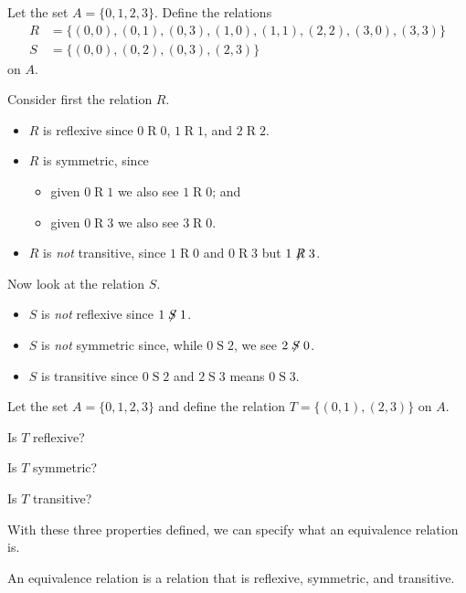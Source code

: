 \begin{example}
    Let the set $A = \{0,1,2,3\}$. Define the relations
    \begin{align*}
        R &= \{(0,0),(0,1),(0,3),(1,0),(1,1),(2,2),(3,0),(3,3)\}\\
        S &= \{(0,0),(0,2),(0,3),(2,3)\}
    \end{align*}
    on $A$.

    Consider first the relation $R$.
    \begin{itemize}
        \item $R$ is reflexive since $0\mathrel{R}0$, $1\mathrel{R}1$, and $2\mathrel{R}2$.
        \item $R$ is symmetric, since
        \begin{itemize}
            \item given $0\mathrel{R}1$ we also see $1\mathrel{R}0$; and
            \item given $0\mathrel{R}3$ we also see $3\mathrel{R}0$.
        \end{itemize}
        \item $R$ is \textit{not} transitive, since $1\mathrel{R}0$ and $0\mathrel{R}3$ but $1\not\mathrel{R}3$.
    \end{itemize}

    Now look at the relation $S$.
    \begin{itemize}
        \item $S$ is \textit{not} reflexive since $1\not\mathrel{S}1$.
        \item $S$ is \textit{not} symmetric since, while $0\mathrel{S}2$, we see $2\not\mathrel{S}0$.
        \item $S$ is transitive since $0\mathrel{S}2$ and $2\mathrel{S}3$ means $0\mathrel{S}3$.
    \end{itemize}
\end{example}

\begin{exercise}
    Let the set $A = \{0, 1, 2, 3\}$ and define the relation $T = \{(0, 1), (2, 3)\}$ on $A$.
    \begin{partquestions}{\alph*}
        \item Is $T$ reflexive?
        \item Is $T$ symmetric?
        \item Is $T$ transitive?
    \end{partquestions}
\end{exercise}

With these three properties defined, we can specify what an equivalence relation is.
\begin{definition}
    An equivalence relation is a relation that is reflexive, symmetric, and transitive.
\end{definition}

